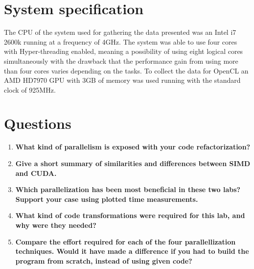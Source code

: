\documentclass[a4paper,11pt]{article}
\begin{document}
\section{System specification}
The CPU of the system used for gathering the data presented was an
Intel i7 2600k running at a frequency of 4GHz. The system was able to
use four cores with Hyper-threading enabled, meaning a possibility of
using eight logical cores simultaneously with the drawback that the
performance gain from using more than four cores varies depending on
the tasks. To collect the data for OpenCL an AMD HD7970 GPU with 3GB
of memory was used running with the standard clock of 925MHz.
\section{Questions}
\begin{enumerate}[label=\Alph*.]
\item \textbf{What kind of parallelism is exposed with your code
  refactorization?}\\

\item \textbf{Give a short summary of similarities and differences
  between SIMD and CUDA.}\\

\item \textbf{Which parallelization has been most beneficial in these
  two labs? Support your case using plotted time measurements.}\\

\item \textbf{What kind of code transformations were required for this
  lab, and why were they needed?}\\

\item \textbf{Compare the effort required for each of the four
  parallellization techniques. Would it have made a difference if you
  had to build the program from scratch, instead of using given
  code?}\\

\end{enumerate}
\end{document}
